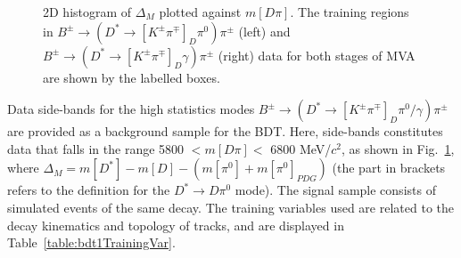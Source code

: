 \documentclass[oneside,12pt]{article}
\begin{document}
\begin{figure}[htp]
\centering
{}
\caption{{2D histogram of $\Delta_M$ plotted against $m[D\pi]$. The
training regions in $B^{\pm}\rightarrow (D^*\rightarrow
[K^{\pm}\pi^{\mp}]_D\pi^0)\pi^{\pm}$ (left) and $B^{\pm}\rightarrow
(D^*\rightarrow [K^{\pm}\pi^{\mp}]_D\gamma)\pi^{\pm}$ (right) data for both
stages of MVA are shown by the labelled boxes.}} \label{fig:trainingData}
\end{figure}

Data side-bands for the high statistics modes $B^{\pm}\rightarrow(D^{*}
\rightarrow [K^{\pm}\pi^{\mp}]_{D} \pi^0 /\gamma)\pi^{\pm}$ are provided as a
background sample for the BDT. Here, side-bands constitutes data that falls in
the range 5800 $ < m[D\pi] <$ 6800 MeV/$c^2$, as shown in
Fig.~\ref{fig:trainingData}, where $\Delta_M=m[D^{*}] - m[D]- (m[\pi^0] +
m[\pi^0]_{PDG})$ (the part in brackets refers to the definition for the
$D^*\rightarrow D\pi^0$ mode). The signal sample consists of simulated
events of the same decay. The training variables used are related to the
decay kinematics and topology of tracks, and are displayed in
Table~\ref{table:bdt1TrainingVar}. 
\end{document}
